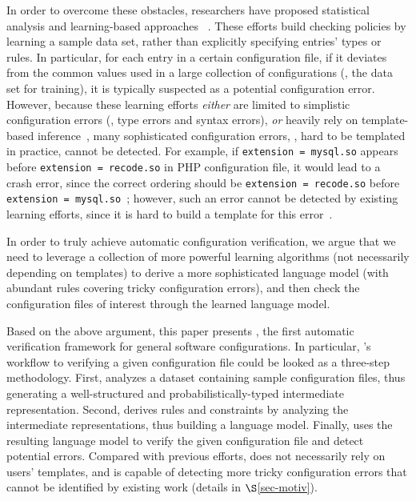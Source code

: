 In order to overcome these obstacles,
researchers have proposed 
statistical analysis and learning-based approaches%
~\cite{wang04automatic, zhang14encore, yuan11context}. 
These efforts build checking policies by learning a sample 
data set, rather than explicitly specifying entries' types or rules.
In particular, for each entry in a certain configuration file, 
if it deviates from the common values used in a large collection
of configurations (\ie, the data set for training), it is typically
suspected as a potential configuration error.
However, because these learning 
efforts {\em either} are limited to simplistic 
configuration errors (\eg, type errors and syntax errors), 
{\em or} heavily rely on template-based inference~\cite{zhang14encore}, 
many sophisticated configuration errors, 
\eg, hard to be templated in practice, cannot be detected.
For example, if {\tt extension = mysql.so} appears 
before {\tt extension = recode.so} in PHP configuration file,  
it would lead to a crash error, since the correct ordering 
should be {\tt extension = recode.so} before 
{\tt extension = mysql.so}~\cite{yin11anempirical};
however, such an error cannot be detected by existing
learning efforts, since it is hard to build a template for this
error~\cite{xu15systems}.


In order to truly achieve automatic configuration verification,
we argue that we need to leverage a collection of more powerful learning 
algorithms (not necessarily depending on templates) to derive 
a more sophisticated language model (with abundant rules covering
tricky configuration errors), and then check the configuration files
of interest through the learned language model.

Based on the above argument, 
this paper presents \app, the first automatic verification framework
for general software configurations.
In particular, \app's workflow to verifying a given configuration file
could be looked as a three-step methodology.
First, \app analyzes a dataset containing sample configuration files,
thus generating a well-structured and probabilistically-typed 
intermediate representation.
Second, \app derives rules and constraints by analyzing
the intermediate representations, thus building a language model.
Finally, \app uses the resulting language model
to verify the given configuration file and detect potential errors.
Compared with previous efforts,
\app does not necessarily rely on users' templates, 
and is capable of detecting more tricky configuration errors that
cannot be identified by existing work (details in $\S$\ref{sec-motiv}). 

